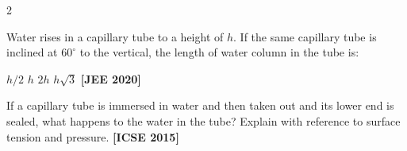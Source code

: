 \documentclass[12pt, a4paper]{exam}
\begin{document}
\begin{multicols}{2}
\begin{questions}
\vspace{0.5em}

\question Water rises in a capillary tube to a height of $h$. If the same capillary tube is inclined at $60^\circ$ to the vertical, the length of water column in the tube is:

\vspace{0.3em}
\begin{oneparchoices}
\choice $h/2$
\choice $h$
\choice $2h$
\choice $h\sqrt{3}$ \hfill\textbf{[JEE 2020]}
\end{oneparchoices}

\vspace{0.5em}

\question If a capillary tube is immersed in water and then taken out and its lower end is sealed, what happens to the water in the tube? Explain with reference to surface tension and pressure. \hfill\textbf{[ICSE 2015]}

\vspace{3em}

\end{questions}
\end{multicols}
\end{document}
